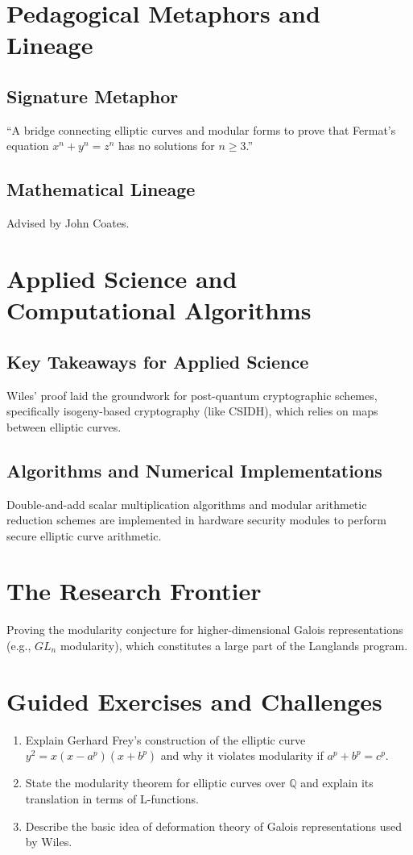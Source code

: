 \section{Pedagogical Metaphors and Lineage}
\subsection{Signature Metaphor}
``A bridge connecting elliptic curves and modular forms to prove that Fermat's equation $x^n + y^n = z^n$ has no solutions for $n \geq 3$.''

\subsection{Mathematical Lineage}
Advised by John Coates.

\section{Applied Science and Computational Algorithms}
\subsection{Key Takeaways for Applied Science}
Wiles' proof laid the groundwork for post-quantum cryptographic schemes, specifically isogeny-based cryptography (like CSIDH), which relies on maps between elliptic curves.

\subsection{Algorithms and Numerical Implementations}
Double-and-add scalar multiplication algorithms and modular arithmetic reduction schemes are implemented in hardware security modules to perform secure elliptic curve arithmetic.

\section{The Research Frontier}
Proving the modularity conjecture for higher-dimensional Galois representations (e.g., $GL_n$ modularity), which constitutes a large part of the Langlands program.

\section{Guided Exercises and Challenges}
\begin{enumerate}[label=\textbf{\arabic*.}]
  \item Explain Gerhard Frey's construction of the elliptic curve $y^2 = x(x-a^p)(x+b^p)$ and why it violates modularity if $a^p+b^p=c^p$.
  \item State the modularity theorem for elliptic curves over $\mathbb{Q}$ and explain its translation in terms of L-functions.
  \item Describe the basic idea of deformation theory of Galois representations used by Wiles.
\end{enumerate}


